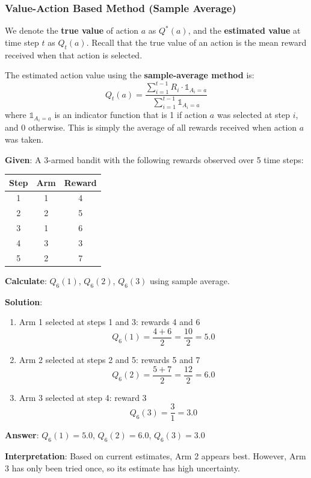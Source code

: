 \documentclass[11pt,a4paper]{article}
\begin{document}
\subsubsection{Value-Action Based Method (Sample Average)}

We denote the \textbf{true value} of action $a$ as $Q^*(a)$, and the \textbf{estimated value} at time step $t$ as $Q_t(a)$. Recall that the true value of an action is the mean reward received when that action is selected.

The estimated action value using the \textbf{sample-average method} is:
\[
Q_t(a) = \frac{\sum_{i=1}^{t-1} R_i \cdot \mathbb{1}_{A_i = a}}{\sum_{i=1}^{t-1} \mathbb{1}_{A_i = a}}
\]
where $\mathbb{1}_{A_i = a}$ is an indicator function that is 1 if action $a$ was selected at step $i$, and 0 otherwise. This is simply the average of all rewards received when action $a$ was taken.

\begin{tcolorbox}[colback=blue!5!white,colframe=blue!75!black,title=\textbf{Worked Example 1: Sample Average Action Value Estimation}]
\textbf{Given}: A 3-armed bandit with the following rewards observed over 5 time steps:
\begin{center}
\begin{tabular}{|c|c|c|}
\hline
\textbf{Step} & \textbf{Arm} & \textbf{Reward} \\ \hline
1 & 1 & 4 \\ \hline
2 & 2 & 5 \\ \hline
3 & 1 & 6 \\ \hline
4 & 3 & 3 \\ \hline
5 & 2 & 7 \\ \hline
\end{tabular}
\end{center}

\textbf{Calculate}: $Q_6(1)$, $Q_6(2)$, $Q_6(3)$ using sample average.

\textbf{Solution}:
\begin{enumerate}
    \item Arm 1 selected at steps 1 and 3: rewards 4 and 6
    \[
    Q_6(1) = \frac{4 + 6}{2} = \frac{10}{2} = 5.0
    \]
    \item Arm 2 selected at steps 2 and 5: rewards 5 and 7
    \[
    Q_6(2) = \frac{5 + 7}{2} = \frac{12}{2} = 6.0
    \]
    \item Arm 3 selected at step 4: reward 3
    \[
    Q_6(3) = \frac{3}{1} = 3.0
    \]
\end{enumerate}

\textbf{Answer}: $Q_6(1) = 5.0$, $Q_6(2) = 6.0$, $Q_6(3) = 3.0$

\textbf{Interpretation}: Based on current estimates, Arm 2 appears best. However, Arm 3 has only been tried once, so its estimate has high uncertainty.
\end{tcolorbox}
\end{document}
